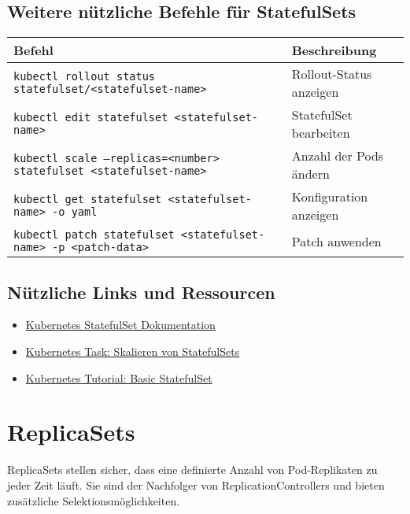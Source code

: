 \subsection{Weitere nützliche Befehle für StatefulSets}
\begin{tabular}{|p{}|p{}|}
\hline
\textbf{Befehl} & \textbf{Beschreibung} \\
\hline
\texttt{kubectl rollout status statefulset/<statefulset-name>} & Rollout-Status anzeigen \\
\texttt{kubectl edit statefulset <statefulset-name>} & StatefulSet bearbeiten \\
\texttt{kubectl scale --replicas=<number> statefulset <statefulset-name>} & Anzahl der Pods ändern \\
\texttt{kubectl get statefulset <statefulset-name> -o yaml} & Konfiguration anzeigen \\
\texttt{kubectl patch statefulset <statefulset-name> -p <patch-data>} & Patch anwenden \\
\hline
\end{tabular}

\subsection{Nützliche Links und Ressourcen}
\begin{itemize}
    \item \href{https://kubernetes.io/docs/concepts/workloads/controllers/statefulset/}{Kubernetes StatefulSet Dokumentation}
    \item \href{https://kubernetes.io/docs/tasks/run-application/scale-stateful-set/}{Kubernetes Task: Skalieren von StatefulSets}
    \item \href{https://kubernetes.io/docs/tutorials/stateful-application/basic-stateful-set/}{Kubernetes Tutorial: Basic StatefulSet}
\end{itemize}



\section{ReplicaSets}
ReplicaSets stellen sicher, dass eine definierte Anzahl von Pod-Replikaten zu jeder Zeit läuft. Sie sind der Nachfolger von ReplicationControllers und bieten zusätzliche Selektionsmöglichkeiten. \\

